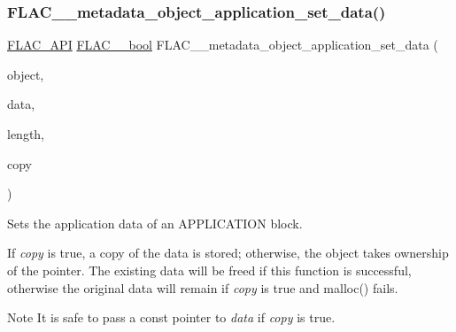 \subsubsection{\texorpdfstring{F\+L\+A\+C\+\_\+\+\_\+metadata\+\_\+object\+\_\+application\+\_\+set\+\_\+data()}{FLAC\_\_metadata\_object\_application\_set\_data()}}
{\footnotesize\ttfamily \hyperlink{group__flac__export_ga56ca07df8a23310707732b1c0007d6f5}{F\+L\+A\+C\+\_\+\+A\+PI} \hyperlink{ordinals_8h_a95103469f1cbd78b8cf250194985b34e}{F\+L\+A\+C\+\_\+\+\_\+bool} F\+L\+A\+C\+\_\+\+\_\+metadata\+\_\+object\+\_\+application\+\_\+set\+\_\+data (\begin{DoxyParamCaption}\item[{\hyperlink{struct_f_l_a_c_____stream_metadata}{F\+L\+A\+C\+\_\+\+\_\+\+Stream\+Metadata} $\ast$}]{object,  }\item[{\hyperlink{ordinals_8h_a5eb569b12d5b047cdacada4d57924ee3}{F\+L\+A\+C\+\_\+\+\_\+byte} $\ast$}]{data,  }\item[{unsigned}]{length,  }\item[{\hyperlink{ordinals_8h_a95103469f1cbd78b8cf250194985b34e}{F\+L\+A\+C\+\_\+\+\_\+bool}}]{copy }\end{DoxyParamCaption})}

Sets the application data of an A\+P\+P\+L\+I\+C\+A\+T\+I\+ON block.

If {\itshape copy} is {\ttfamily true}, a copy of the data is stored; otherwise, the object takes ownership of the pointer. The existing data will be freed if this function is successful, otherwise the original data will remain if {\itshape copy} is {\ttfamily true} and malloc() fails.

\begin{DoxyNote}{Note}
It is safe to pass a const pointer to {\itshape data} if {\itshape copy} is {\ttfamily true}.
\end{DoxyNote}

